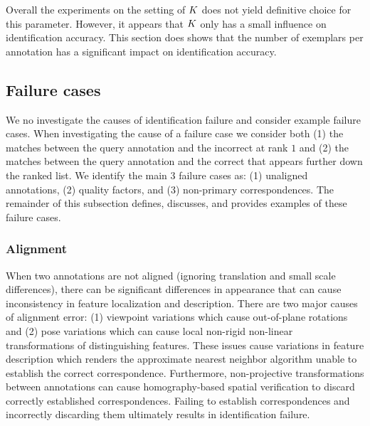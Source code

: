 
        Overall the experiments on the setting of $K$ does not yield definitive choice for this parameter.
        However, it appears that $K$ only has a small influence on identification accuracy.
        This section does shows that the number of exemplars per annotation has a significant impact on
          identification accuracy.

    \subsection{Failure cases}\label{sub:exptfail}  
        
        We no investigate the causes of identification failure and consider example failure cases.
        When investigating the cause of a failure case we consider both
        (1) the matches between the query annotation and the incorrect \name{}  at rank $1$ and
        (2) the matches between the query annotation and the correct \name{} that appears further down the ranked
          list.
        We identify the main 3 failure cases as:
        (1) unaligned annotations,
        (2) quality factors, and
        (3) non-primary correspondences.
        The remainder of this subsection defines, discusses, and provides examples of these failure cases.


        \subsubsection{Alignment}

            \FailViewpoint{}
            
            When two annotations are not aligned (ignoring translation and small scale differences), there can be
              significant differences in appearance that can cause inconsistency in feature localization and
              description.
            There are two major causes of alignment error:
            (1) viewpoint variations which cause out-of-plane rotations and
            (2) pose variations which can cause local non-rigid non-linear transformations of distinguishing
              features.
            These issues cause variations in feature description which renders the approximate nearest neighbor
              algorithm unable to establish the correct correspondence.
            Furthermore, non-projective transformations between annotations can cause homography-based spatial
              verification to discard correctly established correspondences.
            Failing to establish correspondences and incorrectly discarding them ultimately results in
              identification failure.

